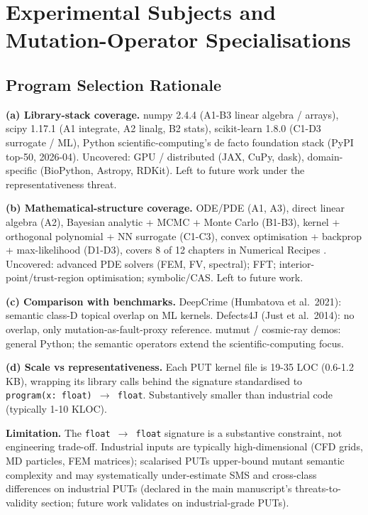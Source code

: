 \documentclass[review,12pt,authoryear]{elsarticle}
\begin{document}
\section{Experimental Subjects and Mutation-Operator Specialisations}\label{b.-experimental-subjects-and-mutation-operator-specialisations}

\subsection{Program Selection Rationale}\label{b.1-put-selection-rationale-detailed-coverage-argument}

\textbf{(a) Library-stack coverage.} numpy 2.4.4 (A1-B3 linear algebra /
arrays), scipy 1.17.1 (A1 integrate, A2 linalg, B2 stats), scikit-learn
1.8.0 (C1-D3 surrogate / ML), Python scientific-computing's de facto
foundation stack (PyPI top-50, 2026-04). Uncovered: GPU / distributed
(JAX, CuPy, dask), domain-specific (BioPython, Astropy, RDKit). Left to
future work under the representativeness threat.

\textbf{(b) Mathematical-structure coverage.} ODE/PDE (A1, A3), direct
linear algebra (A2), Bayesian analytic + MCMC + Monte Carlo (B1-B3),
kernel + orthogonal polynomial + NN surrogate (C1-C3), convex
optimisation + backprop + max-likelihood (D1-D3), covers 8 of 12
chapters in Numerical Recipes \citep{press2007numerical}. Uncovered: advanced
PDE solvers (FEM, FV, spectral); FFT; interior-point/trust-region
optimisation; symbolic/CAS. Left to future work.

\textbf{(c) Comparison with benchmarks.} DeepCrime (Humbatova et
al.~2021): semantic class-D topical overlap on ML kernels. Defects4J (Just et
al.~2014): no overlap, only mutation-as-fault-proxy reference. mutmut /
cosmic-ray demos: general Python; the semantic operators extend the scientific-computing focus.

\textbf{(d) Scale vs representativeness.} Each PUT kernel file is 19-35
LOC (0.6-1.2 KB), wrapping its library calls behind the signature
standardised to \texttt{program(x:\ float)\ $\to$\ float}. Substantively
smaller than industrial code (typically 1-10 KLOC).

\textbf{Limitation.} The \texttt{float\ $\to$\ float} signature is a
substantive constraint, not engineering trade-off. Industrial inputs are
typically high-dimensional (CFD grids, MD particles, FEM matrices);
scalarised PUTs upper-bound mutant semantic complexity and may
systematically under-estimate SMS and cross-class differences on
industrial PUTs (declared in the main manuscript's threats-to-validity section;
future work validates on industrial-grade PUTs).
\end{document}
